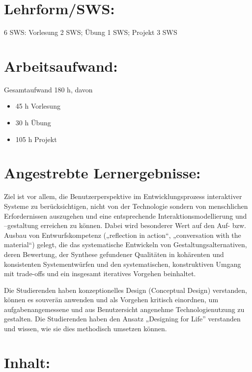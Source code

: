 \section*{Lehrform/SWS:}\label{lehrformsws-6}

6 SWS: Vorlesung 2 SWS; Übung 1 SWS; Projekt 3 SWS

\section*{Arbeitsaufwand:}\label{arbeitsaufwand-11}

Gesamtaufwand 180 h, davon

\begin{itemize}
\tightlist
\item
  45 h Vorlesung
\item
  30 h Übung
\item
  105 h Projekt
\end{itemize}

\section*{Angestrebte
Lernergebnisse:}\label{angestrebte-lernergebnisse-5}

Ziel ist vor allem, die Benutzerperspektive im Entwicklungsprozess
interaktiver Systeme zu berücksichtigen, nicht von der Technologie
sondern von menschlichen Erfordernissen auszugehen und eine
entsprechende Interaktionsmodellierung und --gestaltung erreichen zu
können. Dabei wird besonderer Wert auf den Auf- bzw. Ausbau von
Entwurfskompetenz („reflection in action``, „conversation with the
material``) gelegt, die das systematische Entwickeln von
Gestaltungsalternativen, deren Bewertung, der Synthese gefundener
Qualitäten in kohärenten und konsistenten Systementwürfen und den
systematischen, konstruktiven Umgang mit trade-offs und ein insgesamt
iteratives Vorgehen beinhaltet.

Die Studierenden haben konzeptionelles Design (Conceptual Design)
verstanden, können es souverän anwenden und als Vorgehen kritisch
einordnen, um aufgabenangemessene und aus Benutzersicht angenehme
Technologienutzung zu gestalten. Die Studierenden haben den Ansatz
„Designing for Life'' verstanden und wissen, wie sie dies methodisch
umsetzen können.

\section*{Inhalt:}\label{inhalt-5}

